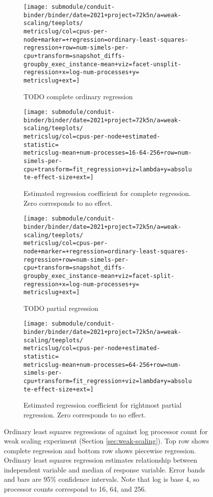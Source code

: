 \begin{figure*}
  \centering

  \begin{subfigure}[b]{0.5\textwidth}
    \centering
    \texttt{[image: submodule/conduit-binder/binder/date=2021+project=72k5n/a=weak-scaling/teeplots/\\metricslug/col=cpus-per-node+marker=+regression=ordinary-least-squares-regression+row=num-simels-per-cpu+transform=snapshot\_diffs-groupby\_exec\_instance-mean+viz=facet-unsplit-regression+x=log-num-processes+y=\\metricslug+ext=]}
    \caption{TODO complete ordinary regression}
    \label{fig:weak-scaling-regression-ols-\metricslug-complete-regression}
  \end{subfigure}%
  \begin{subfigure}[b]{0.5\textwidth}
    \centering
    \texttt{[image: submodule/conduit-binder/binder/date=2021+project=72k5n/a=weak-scaling/teeplots/\\metricslug/col=cpus-per-node+estimated-statistic=\\metricslug-mean+num-processes=16-64-256+row=num-simels-per-cpu+transform=fit\_regression+viz=lambda+y=absolute-effect-size+ext=]}
    \caption{Estimated regression coefficient for complete regression. Zero corresponds to no effect.}
    \label{fig:weak-scaling-regression-ols-\metricslug-complete-effect-size}
  \end{subfigure}

  \begin{subfigure}[b]{0.5\textwidth}
    \centering
    \texttt{[image: submodule/conduit-binder/binder/date=2021+project=72k5n/a=weak-scaling/teeplots/\\metricslug/col=cpus-per-node+marker=+regression=ordinary-least-squares-regression+row=num-simels-per-cpu+transform=snapshot\_diffs-groupby\_exec\_instance-mean+viz=facet-split-regression+x=log-num-processes+y=\\metricslug+ext=]}
    \caption{TODO partial regression}
    \label{fig:weak-scaling-regression-ols-\metricslug-partial-regression}
  \end{subfigure}%
  \begin{subfigure}[b]{0.5\textwidth}
    \centering
    \texttt{[image: submodule/conduit-binder/binder/date=2021+project=72k5n/a=weak-scaling/teeplots/\\metricslug/col=cpus-per-node+estimated-statistic=\\metricslug-mean+num-processes=64-256+row=num-simels-per-cpu+transform=fit\_regression+viz=lambda+y=absolute-effect-size+ext=]}
    \caption{Estimated regression coefficient for rightmost partial regression. Zero corresponds to no effect.}
    \label{fig:weak-scaling-regression-ols-\metricslug-partial-effect-size}
  \end{subfigure}
  \caption{
  Ordinary least squares regressions of \metric{} against log processor count for weak scaling experiment (Section \ref{sec:weak-scaling}).
  Top row shows complete regression and bottom row shows piecewise regression.
  Ordinary least squares regression estimates relationship between independent variable and median of response variable.
  Error bands and bars are 95\% confidence intervals.
  Note that log is base 4, so processor counts correspond to 16, 64, and 256.
  }
  \label{fig:weak-scaling-regression-ols-\metricslug}
\end{figure*}
